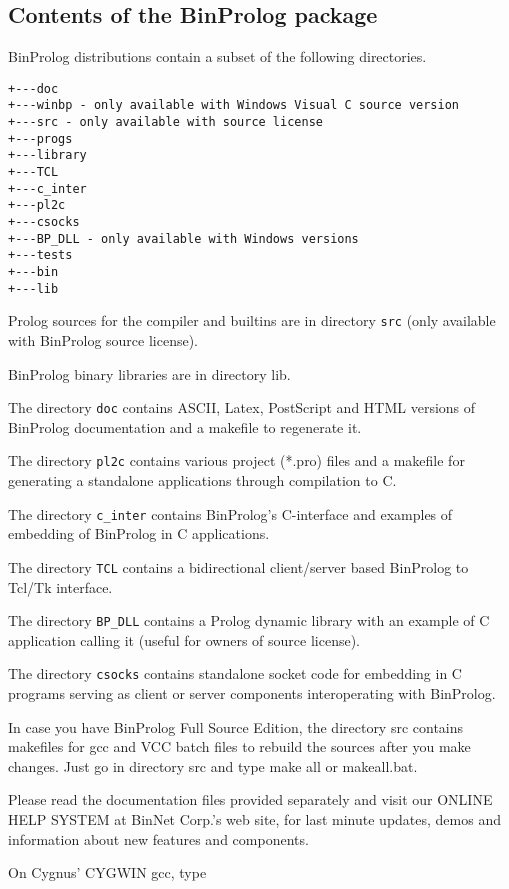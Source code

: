 \documentclass{article}
\begin{document}
\subsection{Contents of the BinProlog package}

BinProlog distributions contain a subset of the following directories.

\begin{verbatim}
+---doc
+---winbp - only available with Windows Visual C source version
+---src - only available with source license
+---progs
+---library
+---TCL
+---c_inter
+---pl2c
+---csocks
+---BP_DLL - only available with Windows versions
+---tests
+---bin
+---lib
\end{verbatim}

Prolog sources for the compiler and builtins
are in directory {\tt src} (only available with BinProlog source license).

BinProlog binary libraries are in directory lib.

The directory {\tt doc} contains ASCII, Latex, PostScript and HTML
versions of BinProlog documentation and a makefile to regenerate it.

The directory {\tt pl2c} contains
various project (*.pro) files
and a makefile for generating a standalone applications
through compilation to C.

The directory {\tt c\_inter} contains BinProlog's C-interface
and examples of embedding of BinProlog in C applications.

The directory {\tt TCL} contains a bidirectional client/server based
BinProlog to Tcl/Tk interface.

The directory {\tt BP\_DLL} contains a Prolog dynamic library with an
example of C application calling it (useful for
owners of source license).

The directory {\tt csocks} contains standalone socket code for
embedding in C programs serving as client or server components
interoperating with BinProlog.

In case you have BinProlog Full Source Edition, the directory src
contains makefiles for gcc and VCC batch files to rebuild the
sources after you make changes. Just go in directory src and type
make all or makeall.bat.

Please read the documentation files provided separately and visit
our ONLINE HELP SYSTEM at BinNet Corp.'s web site, for last minute
updates, demos and information about new features and components.

On Cygnus' CYGWIN gcc, type
\end{document}
